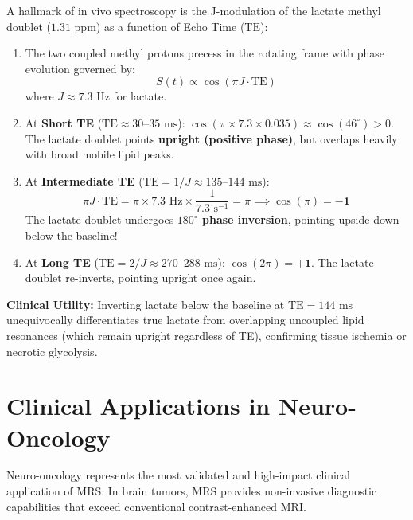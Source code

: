 \documentclass[11pt,a4paper]{article}
\begin{document}
\begin{physicsbox}
A hallmark of in vivo spectroscopy is the J-modulation of the lactate methyl doublet ($1.31\text{ ppm}$) as a function of Echo Time ($\text{TE}$):
\begin{enumerate}[leftmargin=1.5em]
    \item The two coupled methyl protons precess in the rotating frame with phase evolution governed by:
    \begin{equation}
        S(t) \propto \cos(\pi J \cdot \text{TE})
    \end{equation}
    where $J \approx 7.3\text{ Hz}$ for lactate.
    \item At \textbf{Short TE} ($\text{TE} \approx 30\text{--}35\text{ ms}$): $\cos(\pi \times 7.3 \times 0.035) \approx \cos(46^\circ) > 0$. The lactate doublet points \textbf{upright (positive phase)}, but overlaps heavily with broad mobile lipid peaks.
    \item At \textbf{Intermediate TE} ($\text{TE} = 1 / J \approx 135\text{--}144\text{ ms}$):
    \begin{equation}
        \pi J \cdot \text{TE} = \pi \times 7.3\text{ Hz} \times \frac{1}{7.3\text{ s}^{-1}} = \pi \implies \cos(\pi) = \mathbf{-1}
    \end{equation}
    The lactate doublet undergoes \textbf{$180^\circ$ phase inversion}, pointing upside-down below the baseline!
    \item At \textbf{Long TE} ($\text{TE} = 2 / J \approx 270\text{--}288\text{ ms}$): $\cos(2\pi) = \mathbf{+1}$. The lactate doublet re-inverts, pointing upright once again.
\end{enumerate}
\textbf{Clinical Utility:} Inverting lactate below the baseline at $\text{TE} = 144\text{ ms}$ unequivocally differentiates true lactate from overlapping uncoupled lipid resonances (which remain upright regardless of TE), confirming tissue ischemia or necrotic glycolysis.
\end{physicsbox}

\section{Clinical Applications in Neuro-Oncology}
Neuro-oncology represents the most validated and high-impact clinical application of MRS. In brain tumors, MRS provides non-invasive diagnostic capabilities that exceed conventional contrast-enhanced MRI.
\end{document}
